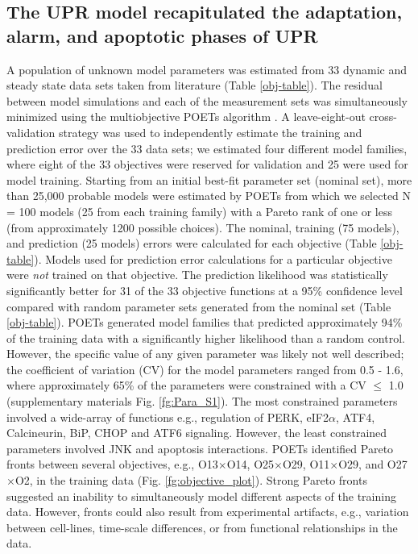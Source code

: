 \documentclass[fleqn,10pt]{wlscirep}
\begin{document}
\subsection*{The UPR model recapitulated the adaptation, alarm, and apoptotic phases of UPR}
A population of unknown model parameters was estimated from 33 dynamic and steady state data sets taken from literature (Table \ref{obj-table}).
The residual between model simulations and each of the measurement sets was simultaneously minimized using the multiobjective POETs algorithm \cite{Song:2010ij}.
A leave-eight-out cross-validation strategy was used to independently estimate the training and prediction error over the 33 data sets; we estimated four different model families,
where eight of the 33 objectives were reserved for validation and 25 were used for model training.
Starting from an initial best-fit parameter set (nominal set), more than 25,000 probable models were estimated by POETs from which we selected N = 100 models (25 from each training family) with a Pareto rank of one or less (from approximately 1200 possible choices).
The nominal, training (75 models), and prediction (25 models) errors were calculated for each objective (Table \ref{obj-table}).
Models used for prediction error calculations for a particular objective were \emph{not} trained on that objective.
The prediction likelihood was statistically significantly better for 31 of the 33 objective functions at a 95\% confidence level compared with random parameter sets generated from the nominal set (Table \ref{obj-table}).
POETs generated model families that predicted approximately 94\% of the training data with a significantly higher likelihood than a random control.
However, the specific value of any given parameter was likely not well described; the coefficient of variation (CV) for the model parameters ranged from 0.5 - 1.6, where approximately 65\% of the parameters were constrained with a CV $\leq$ 1.0 (supplementary materials Fig. \ref{fg:Para_S1}).
The most constrained parameters involved a wide-array of functions e.g., regulation of PERK, eIF2$\alpha$, ATF4, Calcineurin, BiP, CHOP and ATF6 signaling.
However, the least constrained parameters involved JNK and apoptosis interactions.
POETs identified Pareto fronts between several objectives, e.g., O13$\times$O14, O25$\times$O29, O11$\times$O29, and O27$\times$O2, in the training data  (Fig. \ref{fg:objective_plot}).
Strong Pareto fronts suggested an inability to simultaneously model different aspects of the training data.
However, fronts could also result from experimental artifacts, e.g., variation between cell-lines, time-scale differences, or from functional relationships in the data.
\end{document}
